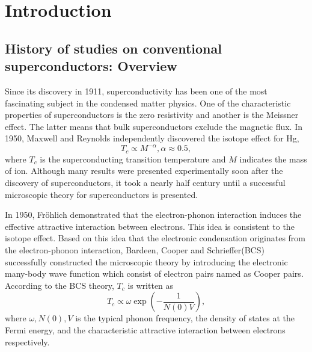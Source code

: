 

%
%
\chapter{Introduction}



\section{History of studies on conventional superconductors: Overview}
Since its discovery in 1911\cite{Onnes1911}, superconductivity has been one of the most fascinating
subject in the condensed matter physics. One of the characteristic properties of superconductors is
the zero resistivity and another is the Meissner effect\cite{Meissner1933}.
The latter means that bulk superconductors exclude the magnetic flux.
In 1950, Maxwell\cite{Maxwell1950} and Reynolds\cite{Reynolds1950} independently discovered the 
isotope effect for Hg,
%
\begin{equation}
	T_{c} \propto M^{-\alpha}, \alpha \approx 0.5,
	\label{eq:isotope}
\end{equation}
%
where $T_c$ is the superconducting transition temperature and $M$ indicates the mass of ion.
Although many results were presented experimentally soon after the discovery of superconductors,
it took a nearly half century until a successful microscopic theory for superconductors is presented.

In 1950, Fr\"{o}hlich\cite{Froehlich1950} demonstrated that the electron-phonon interaction induces the
effective attractive interaction between electrons. This idea is consistent to the isotope effect.
Based on this idea that the electronic condensation originates from the electron-phonon interaction, 
Bardeen, Cooper and Schrieffer(BCS)\cite{BCS1957} successfully constructed the microscopic 
theory by introducing the electronic many-body wave function which consist of electron pairs named as
Cooper pairs\cite{Cooper1956}. According to the BCS theory, $T_c$ is written as
%
\begin{equation}
	T_{c} \propto \omega\exp \left( -\frac{1}{N(0)V} \right),
	\label{eq:TcBCS}
\end{equation}
%
where $\omega, N(0), V$ is the typical phonon frequency, the density of states at the Fermi energy, 
and the characteristic attractive interaction between electrons respectively.

